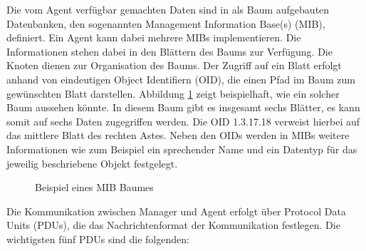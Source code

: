 Die vom Agent verfügbar gemachten Daten sind in als Baum aufgebauten Datenbanken, den sogenannten Management Information Base(s) (MIB), definiert. Ein Agent kann dabei mehrere MIBs implementieren.\cite{essential-SNMP} Die Informationen stehen dabei in den Blättern des Baums zur Verfügung. Die Knoten dienen zur Organisation des Baums. Der Zugriff auf ein Blatt erfolgt anhand von eindeutigen Object Identifiern (OID), die einen Pfad im Baum zum gewünschten Blatt darstellen. Abbildung \ref{fig:snmptree} zeigt beispielhaft, wie ein solcher Baum aussehen könnte. In diesem Baum gibt es insgesamt sechs Blätter, es kann somit auf sechs Daten zugegriffen werden. Die OID 1.3.17.18 verweist hierbei auf das mittlere Blatt des rechten Astes. Neben den OIDs werden in MIBs weitere Informationen wie zum Beispiel ein sprechender Name und ein Datentyp für das jeweilig beschriebene Objekt festgelegt.

\begin{figure}[H]
  \begin{center}
    \caption{Beispiel eines MIB Baumes}
    \label{fig:snmptree}
  \end{center}
\end{figure}

Die Kommunikation zwischen Manager und Agent erfolgt über Protocol Data Units (PDUs), die das Nachrichtenformat der Kommunikation festlegen.\cite{essential-SNMP} Die wichtigsten fünf PDUs sind die folgenden:

